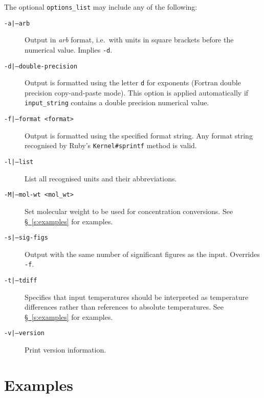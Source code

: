 \documentclass[fontsize=12pt,
               appendixprefix=true,
               captions=abovetable,
               numbers=noenddot,
              ]{scrartcl}
\newcommand{\ie}[1][\ ]{i.e.#1}
\newcommand{\sect}[1]{\hyperref[s:#1]{\S~\ref{s:#1}}}
\begin{document}
The optional \texttt{options\_list} may include any of the following:
\begin{description}
\item[\texttt{-a|--arb}] Output in \emph{arb} format, \ie with units in square brackets before the numerical value. Implies \texttt{-d}.
\item[\texttt{-d|--double-precision}] Output is formatted using the letter \texttt{d} for exponents (Fortran double precision copy-and-paste mode). This option is applied automatically if \texttt{input\_string} contains a double precision numerical value.
\item[\texttt{-f|--format <format>}] Output is formatted using the specified format string. Any format string recognised by Ruby's \texttt{Kernel\#sprintf} method is valid.
\item[\texttt{-l|--list}] List all recognised units and their abbreviations.
\item[\texttt{-M|--mol-wt <mol\_wt>}] Set molecular weight to be used for concentration conversions. See \sect{examples} for examples.
\item[\texttt{-s|--sig-figs}] Output with the same number of significant figures as the input. Overrides \texttt{-f}.
\item[\texttt{-t|--tdiff}] Specifies that input temperatures should be interpreted as temperature differences rather than references to absolute temperatures. See \sect{examples} for examples.
\item[\texttt{-v|--version}] Print version information.
\end{description}

\clearpage
\section{Examples \label{s:examples}}
\end{document}
